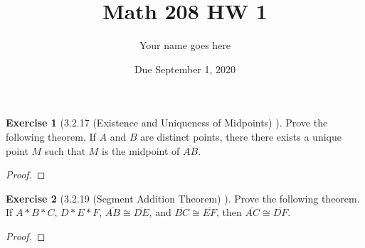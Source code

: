 \documentclass[12pt]{article}		%
\title{Math 208 HW 1}
\author{Your name goes here}
\date{Due September 1, 2020}
\theoremstyle{definition}
\newtheorem*{ex}{Exercise}
\newcommand{\seg}[1]{\overline{#1}}
\begin{document}
	\maketitle
	
	
	\begin{ex}[3.2.17 (Existence and Uniqueness of Midpoints) ]
		Prove the following theorem.  If $A$ and $B$ are distinct points, there there exists a unique point $M$ such that $M$ is the midpoint of $\seg{AB}$.
	\end{ex}
	
	\begin{proof} 
		
	\end{proof}

\vspace{1in} %
	
	\vspace{.25in}
	
	
	\begin{ex}[3.2.19 (Segment Addition Theorem) ]
		Prove the following theorem.  If $A * B * C$, $D * E *F$, $\seg{AB} \cong \seg{DE}$, and $\seg{BC} \cong \seg{EF}$, then $\seg{AC} \cong \seg{DF}$.
	\end{ex}
	
	\begin{proof} 
		
	\end{proof}


\vspace{1in} %
	
	
	
\end{document}
